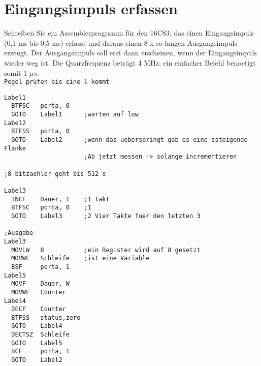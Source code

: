 \section*{Eingangsimpuls erfassen }
Schreiben Sie ein Assemblerprogramm für den 16C83, das einen Eingangsimpuls (0,1 ms bis 0,5
ms) erfasst und daraus einen 8 x so langen Ausgangsimpuls erzeugt. Der Ausgangsimpuls soll erst
dann erscheinen, wenn der Eingangsimpuls wieder weg ist. Die Quarzfrequenz beträgt 4 MHz; ein
einfacher Befehl benoetigt somit 1 $\mu s$.\\
\texttt{Pegel prüfen bis eine $1$ kommt}
\begin{lstlisting}[language=avr]
Label1
  BTFSC   porta, 0
  GOTO    Label1      ;warten auf low
Label2
  BTFSS   porta, 0
  GOTO    Label2      ;wenn das ueberspringt gab es eine ssteigende Flanke
                      ;Ab jetzt messen -> solange incrementieren

;8-bitzaehler geht bis 512 s

Label3
  INCF    Dauer, 1    ;1 Takt
  BTFSC   porta, 0    ;1
  GOTO    Label3      ;2 Vier Takte fuer den letzten 3
   
;Ausgabe
Label3
  MOVLW   8           ;ein Register wird auf 8 gesetzt
  MOVWF   Schleife    ;ist eine Variable
  BSF     porta, 1   
Label5
  MOVF    Dauer, W
  MOVWF   Counter
Label4
  DECF    Counter
  BTFSS   status,zero
  GOTO    Label4
  DECTSZ  Schleife
  GOTO    Label5
  BCF     porta, 1
  GOTO    Label2
\end{lstlisting}